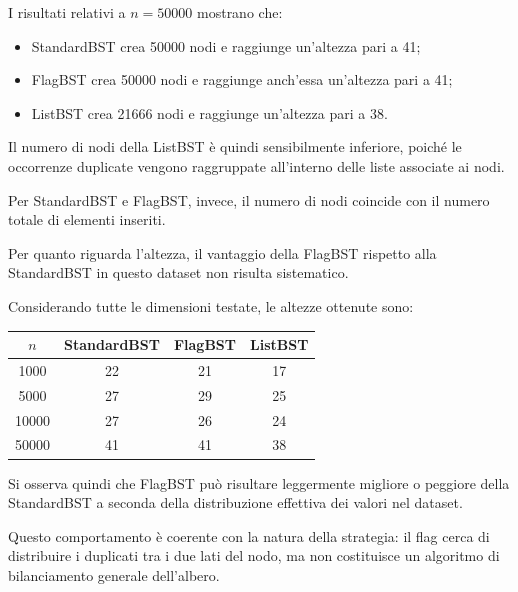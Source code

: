 \documentclass[a4paper,12pt]{article}
\begin{document}
I risultati relativi a $n=50000$ mostrano che:

\begin{itemize}

    \item StandardBST crea 50000 nodi e raggiunge un'altezza pari a 41;

    \item FlagBST crea 50000 nodi e raggiunge anch'essa un'altezza pari a 41;

    \item ListBST crea 21666 nodi e raggiunge un'altezza pari a 38.

\end{itemize}

Il numero di nodi della ListBST è quindi sensibilmente inferiore, poiché le occorrenze duplicate vengono raggruppate all'interno delle liste associate ai nodi.

Per StandardBST e FlagBST, invece, il numero di nodi coincide con il numero totale di elementi inseriti.

Per quanto riguarda l'altezza, il vantaggio della FlagBST rispetto alla StandardBST in questo dataset non risulta sistematico.

Considerando tutte le dimensioni testate, le altezze ottenute sono:

\begin{center}

\begin{tabular}{c|ccc}

$n$ & StandardBST & FlagBST & ListBST \\

\hline

1000 & 22 & 21 & 17 \\

5000 & 27 & 29 & 25 \\

10000 & 27 & 26 & 24 \\

50000 & 41 & 41 & 38

\end{tabular}

\end{center}

Si osserva quindi che FlagBST può risultare leggermente migliore o peggiore della StandardBST a seconda della distribuzione effettiva dei valori nel dataset.

Questo comportamento è coerente con la natura della strategia: il flag cerca di distribuire i duplicati tra i due lati del nodo, ma non costituisce un algoritmo di bilanciamento generale dell'albero.
\end{document}
